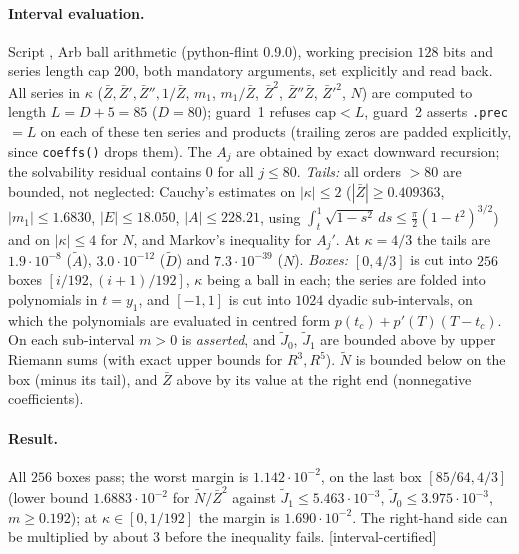 \documentclass[11pt,a4paper]{article}
\theoremstyle{remark}
\theoremstyle{definition}
\newcommand{\st}[1]{\textsf{[#1]}}
\newcommand{\Zb}{\bar Z}
\begin{document}
\paragraph{Interval evaluation.} Script , Arb ball arithmetic
(python-flint 0.9.0), working precision $128$ bits and series length cap $200$, both mandatory arguments, set
explicitly and read back. All series in $\kappa$ ($\Zb,\Zb',\Zb'',1/\Zb$, $m_1$, $m_1/\Zb$, $\Zb^2$, $\Zb''\Zb$, $\Zb'^2$,
$N$) are computed to length $L=D+5=85$ ($D=80$); guard~1 refuses $\mathrm{cap}<L$, guard~2 asserts
\texttt{.prec}${}=L$ on each of these ten series and products (trailing zeros are padded explicitly, since
\texttt{coeffs()} drops them). The $A_j$ are obtained by exact downward recursion; the solvability residual
contains $0$ for all $j\le80$. \emph{Tails:} all orders $>80$ are bounded, not neglected: Cauchy's estimates on
$|\kappa|\le2$ ($|\Zb|\ge0.409363$, $|m_1|\le1.6830$, $|E|\le18.050$, $|A|\le228.21$, using
$\int_t^1\sqrt{1-s^2}\,ds\le\frac\pi2(1-t^2)^{3/2}$) and on $|\kappa|\le4$ for $N$, and Markov's inequality for
$A_j'$. At $\kappa=4/3$ the tails are $1.9\cdot10^{-8}$ ($\tilde A$), $3.0\cdot10^{-12}$ ($\tilde D$) and
$7.3\cdot10^{-39}$ ($N$).
\emph{Boxes:} $[0,4/3]$ is cut into $256$ boxes $[i/192,(i+1)/192]$, $\kappa$ being a ball in each; the series are
folded into polynomials in $t=y_1$, and $[-1,1]$ is cut into $1024$ dyadic sub-intervals, on which the polynomials
are evaluated in centred form $p(t_c)+p'(T)(T-t_c)$. On each sub-interval $m>0$ is \emph{asserted}, and $\tilde J_0$,
$\tilde J_1$ are bounded above by upper Riemann sums (with exact upper bounds for $R^3,R^5$). $\tilde N$ is bounded
below on the box (minus its tail), and $\Zb$ above by its value at the right end (nonnegative coefficients).

\paragraph{Result.} All $256$ boxes pass; the worst margin is $1.142\cdot10^{-2}$, on the last box
$[85/64,4/3]$ (lower bound $1.6883\cdot10^{-2}$ for $\tilde N/\Zb^2$ against $\tilde J_1\le5.463\cdot10^{-3}$,
$\tilde J_0\le3.975\cdot10^{-3}$, $m\ge0.192$); at $\kappa\in[0,1/192]$ the margin is $1.690\cdot10^{-2}$.
The right-hand side can be multiplied by about $3$ before the inequality fails. \st{interval-certified}
\end{document}
